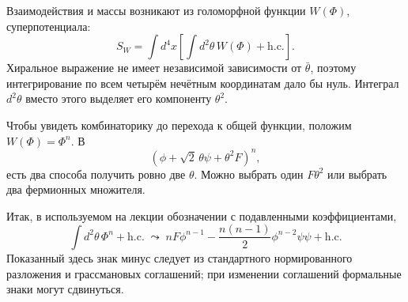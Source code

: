 Взаимодействия и массы возникают из голоморфной функции \(W(\Phi)\), суперпотенциала:
\begin{equation}
S_W
=
\int d^4x
\left[
\int d^2\theta\,W(\Phi)
+\mathrm{h.c.}
\right].
\label{eq:l9-superpotential-action}
\end{equation}
Хиральное выражение не имеет независимой зависимости от \(\bar\theta\), поэтому интегрирование по всем четырём нечётным координатам дало бы нуль. Интеграл \(d^2\theta\) вместо этого выделяет его компоненту \(\theta^2\).

Чтобы увидеть комбинаторику до перехода к общей функции, положим \(W(\Phi)=\Phi^n\). В
\begin{equation}
(\phi+\sqrt2\,\theta\psi+\theta^2F)^n,
\end{equation}
есть два способа получить ровно две \(\theta\). Можно выбрать один \(F\theta^2\) или выбрать два фермионных множителя.

\begin{classroomqa}
\end{classroomqa}

\begin{classroomqa}
\end{classroomqa}

Итак, в используемом на лекции обозначении с подавленными коэффициентами,
\begin{equation}
\int d^2\theta\,\Phi^n+\mathrm{h.c.}
\;\leadsto\;
nF\phi^{n-1}
-\frac{n(n-1)}{2}\phi^{n-2}\psi\psi
+\mathrm{h.c.}
\label{eq:l9-power-extraction}
\end{equation}
Показанный здесь знак минус следует из стандартного нормированного разложения и грассмановых соглашений; при изменении соглашений формальные знаки могут сдвинуться.

\begin{classroomqa}
\end{classroomqa}

